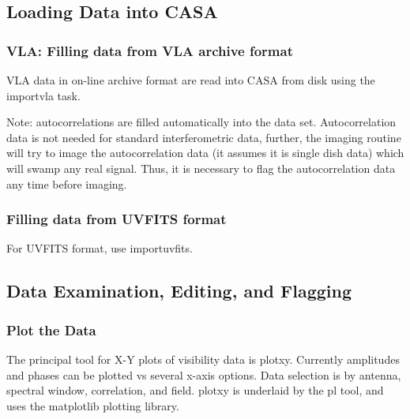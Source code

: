\subsection{Loading Data into CASA}
\label{subsection:load.data}

\subsubsection{VLA: Filling data from VLA archive format}
\label{subsubsection:VLA.fill}

VLA data in on-line archive format are read into CASA from disk using
the importvla task. 

Note: autocorrelations are filled automatically into the data
set. Autocorrelation data is not needed for standard interferometric
data, further, the imaging routine will try to image the
autocorrelation data (it assumes it is single dish data) which will
swamp any real signal. Thus, it is necessary to flag the
autocorrelation data any time before imaging. 

\subsubsection{Filling data from UVFITS format}
\label{subsubsection:uvfits.fill}

For UVFITS format, use importuvfits.

\subsection{Data Examination, Editing, and Flagging} 
\label{subsection:flagging}

\subsubsection{Plot the Data}
\label{subsubsection:plot.data}

The principal tool for X-Y plots of visibility data is
plotxy. Currently amplitudes and phases can be plotted vs several
x-axis options. Data selection is by antenna, spectral window,
correlation, and field. plotxy is underlaid by the pl tool, and uses
the matplotlib plotting library.

